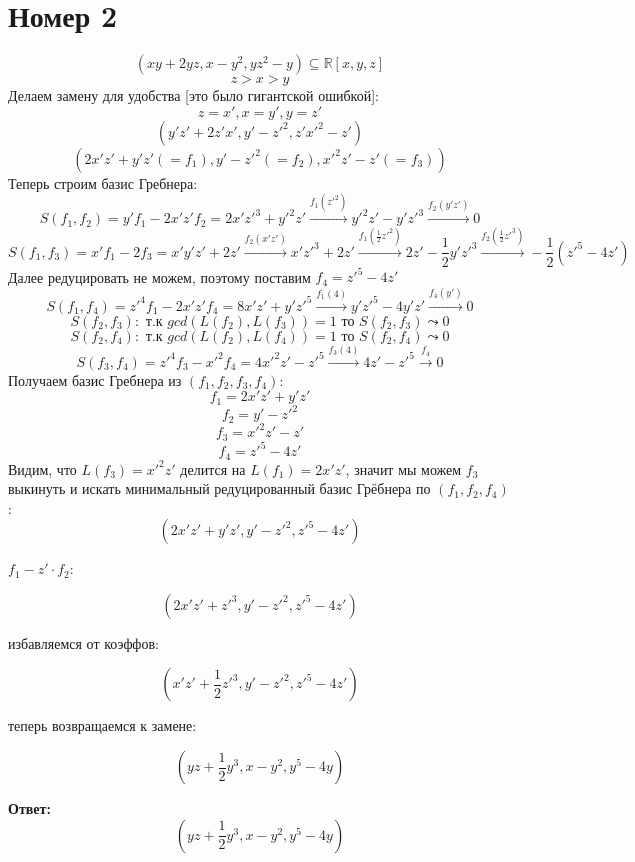 \documentclass[a4paper,12pt]{article}
\begin{document}
\section*{Номер 2}
\[
(xy + 2yz, x - y^2, yz^2 - y) \subseteq \mathbb{R}[x, y, z]
\]
\[
z > x > y
\]
Делаем замену для удобства [это было гигантской ошибкой]:
\[
z = x', x = y', y = z'
\]
\[
(y'z'+ 2z'x', y' - z'^2, z'x'^2 - z')
\]
\[
( 2x'z' + y'z' (=f_1), y' - z'^2(=f_2), x'^2z' - z'(=f_3))
\]
Теперь строим базис Гребнера:
\[
S(f_1, f_2) = y'f_1 - 2x'z'f_2 = 2x'z'^3 + y'^2z' \stackrel{f_1(z'^2)}{\rightarrow} y'^2z' - y'z'^3 \stackrel{f_2(y'z')}{\rightarrow} 0
\]
\[
S(f_1, f_3) = x'f_1 - 2f_3 = x'y'z'+ 2z' \stackrel{f_2(x'z')}{\rightarrow} x'z'^3 + 2z' \stackrel{f_1(\frac{1}{2}z'^2)}{\rightarrow} 2z' -\frac{1}{2}y'z'^3 \stackrel{f_2(\frac{1}{2}z'^3)}{\rightarrow} - \frac{1}{2}(z'^5 - 4z') 
\]
Далее редуцировать не можем, поэтому поставим $f_4 = z'^5 - 4z'$
\[
S(f_1, f_4) = z'^4f_1 -2x'z'f_4 =  8x'z' + y'z'^5 \stackrel{f_1(4)}{\rightarrow} y'z'^5 - 4y'z' \stackrel{f_4(y')}{\rightarrow} 0 
\]
\[
S(f_2, f_3) : \text{ т.к }gcd(L(f_2), L(f_3)) = 1 \text{ то } S(f_2, f_3) \leadsto 0
\]
\[
S(f_2, f_4): \text{ т.к }gcd(L(f_2), L(f_4)) = 1 \text{ то } S(f_2, f_4) \leadsto 0
\]
\[
S(f_3, f_4) = z'^4 f_3 - x'^2f_4  = 4x'^2z' - z'^5 \stackrel{f_3(4)}{\rightarrow} 4z' - z'^5 \stackrel{f_4}{\rightarrow} 0
\]
Получаем базис Гребнера из $(f_1, f_2, f_3, f_4)$:
\[
f_1 = 2x'z' + y'z'
\]
\[
f_2 = y' - z'^2
\]
\[
f_3 = x'^2z' - z'
\]
\[
f_4 = z'^5 - 4z'
\]
Видим, что $L(f_3) = x'^2z'$ делится на $L(f_1) = 2x'z'$, значит мы можем $f_3$ выкинуть и искать минимальный редуцированный базис Грёбнера по $(f_1, f_2, f_4)$:
\[
(2x'z' + y'z', y' -z'^2, z'^5 - 4z')
\]
\begin{center}
$f_1 -  z'\cdot f_2$:
\end{center}
\[
(2x'z'+z'^3, y'- z'^2, z'^5 - 4z')
\]
\begin{center}
\clearpage
избавляемся от коэффов:
\end{center}
\[
(x'z' + \frac{1}{2}z'^3, y' - z'^2, z'^5 - 4z')
\]
\begin{center}
теперь возвращаемся к замене:
\end{center}
\[
(yz + \frac{1}{2}y^3, x - y^2, y^5 - 4y)
\]
\begin{center}
\textbf{Ответ: } 
\[
(yz + \frac{1}{2}y^3, x - y^2, y^5 - 4y)
\]
\end{center}
\clearpage
\end{document}
